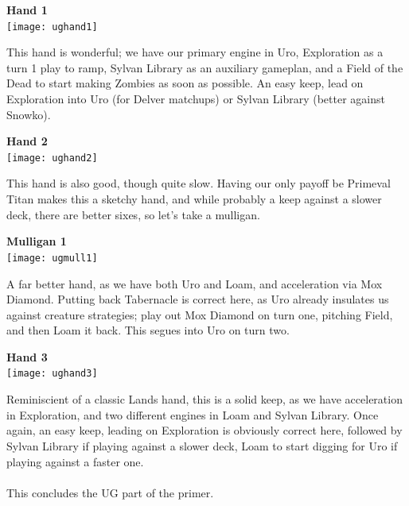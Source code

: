 \documentclass{report}
\begin{document}
\begin{center}
\textbf{Hand 1\\}
\texttt{[image: ughand1]}
\end{center}
This hand is wonderful; we have our primary engine in Uro, Exploration as a turn 1 play to ramp, Sylvan Library as an auxiliary gameplan, and a Field of the Dead to start making Zombies as soon as possible. An easy keep, lead on Exploration into Uro (for Delver matchups) or Sylvan Library (better against Snowko).
\newpage
\begin{center}
\textbf{Hand 2\\}
\texttt{[image: ughand2]}
\end{center}
This hand is also good, though quite slow. Having our only payoff be Primeval Titan makes this a sketchy hand, and while probably a keep against a slower deck, there are better sixes, so let's take a mulligan.
\begin{center}
\textbf{Mulligan 1\\}
\texttt{[image: ugmull1]}
\end{center}
A far better hand, as we have both Uro and Loam, and acceleration via Mox Diamond. Putting back Tabernacle is correct here, as Uro already insulates us against creature strategies; play out Mox Diamond on turn one, pitching Field, and then Loam it back. This segues into Uro on turn two.
\begin{center}
\textbf{Hand 3\\}
\texttt{[image: ughand3]}
\end{center}
Reminiscient of a classic Lands hand, this is a solid keep, as we have acceleration in Exploration, and two different engines in Loam and Sylvan Library. Once again, an easy keep, leading on Exploration is obviously correct here, followed by Sylvan Library if playing against a slower deck, Loam to start digging for Uro if playing against a faster one.\\\\
This concludes the UG part of the primer.
\end{document}
